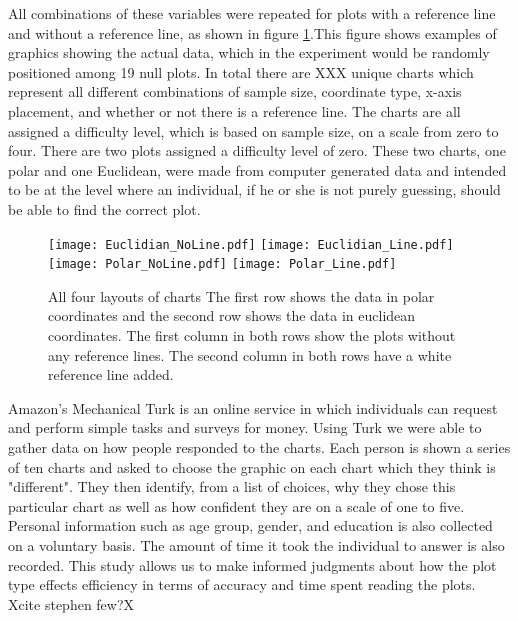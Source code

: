  All combinations of these variables were repeated for plots with a reference line and without a reference line, as shown in figure \ref{layouts}.This figure shows examples of graphics showing the actual data, which in the experiment would be randomly positioned among 19 null plots. In total there are XXX unique charts which represent all different combinations of sample size, coordinate type, x-axis placement, and whether or not there is a reference line. The charts are all assigned a difficulty level, which is based on sample size, on a scale from zero to four. There are two plots assigned a difficulty level of zero. These two charts, one polar and one Euclidean, were made from computer generated data and intended to be at the level where an individual, if he or she is not purely guessing, should be able to find the correct plot. 

\begin{figure}[htbp] %
   \centering
   \texttt{[image: Euclidian\_NoLine.pdf]} \hspace{0.05\linewidth}
   \texttt{[image: Euclidian\_Line.pdf]} \\
   \texttt{[image: Polar\_NoLine.pdf]} 
   \texttt{[image: Polar\_Line.pdf]}  
   \caption{All four layouts of charts The first row shows the data in polar coordinates and the second row shows the data in euclidean coordinates. The first column in both rows show the plots without any reference lines. The second column in both rows have a white reference line added. }
   \label{layouts}
\end{figure}

Amazon's Mechanical Turk is an online service in which individuals can request and perform simple tasks and surveys for money. Using Turk we were able to gather data on how people responded to the charts. Each person is shown a series of ten charts and asked to choose the graphic on each chart which they think is "different". They then identify, from a list of choices, why they chose this particular chart as well as how confident they are on a scale of one to five. Personal information such as age group, gender, and education is also collected on a voluntary basis. The amount of time it took the individual to answer is also recorded. This study allows us to make informed judgments about how the plot type effects efficiency in terms of accuracy and time spent reading the plots. Xcite stephen few?X

